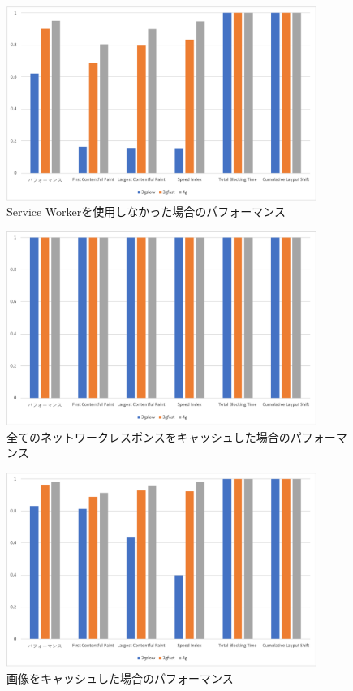 \begin{figure}
  \centering
  \includegraphics[width=0.9\textwidth]{images/without_service_worker.png}
  \caption{Service Workerを使用しなかった場合のパフォーマンス}\label{figure:Service Workerを使用しなかった場合のパフォーマンス}
\end{figure}

\begin{figure}
  \centering
  \includegraphics[width=0.9\textwidth]{images/service_worker_cache_all.png}
  \caption{全てのネットワークレスポンスをキャッシュした場合のパフォーマンス}\label{figure:全てのネットワークレスポンスをキャッシュした場合のパフォーマンス}
\end{figure}

\begin{figure}
  \centering
  \includegraphics[width=0.9\textwidth]{images/service_worker_cache_same_origin.png}
  \caption{画像をキャッシュした場合のパフォーマンス}\label{figure:画像をキャッシュした場合のパフォーマンス}
\end{figure}

